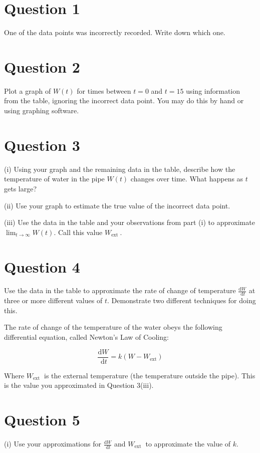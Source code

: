 \documentclass[12pt]{article}
\begin{document}
\section*{Question 1}
One of the data points was incorrectly recorded. Write down which one.

\section*{Question 2}
Plot a graph of $W(t)$ for times between $t=0$ and $t=15$ using information from the table, ignoring the incorrect data point. You may do this by hand or using graphing software.

\section*{Question 3}
(i) Using your graph and the remaining data in the table, describe how the temperature of water in the pipe $W(t)$ changes over time. What happens as $t$ gets large?

(ii) Use your graph to estimate the true value of the incorrect data point.

(iii) Use the data in the table and your observations from part (i) to approximate $\lim _{t \rightarrow \infty} W(t)$. Call this value $W_{\text {ext }}$.

\section*{Question 4}
Use the data in the table to approximate the rate of change of temperature $\frac{\mathrm{d} W}{\mathrm{~d} t}$ at three or more different values of $t$. Demonstrate two different techniques for doing this.

The rate of change of the temperature of the water obeys the following differential equation, called Newton's Law of Cooling:

$$
\frac{\mathrm{d} W}{\mathrm{~d} t}=k\left(W-W_{\mathrm{ext}}\right)
$$

Where $W_{\text {ext }}$ is the external temperature (the temperature outside the pipe). This is the value you approximated in Question 3(iii).

\section*{Question 5}
(i) Use your approximations for $\frac{\mathrm{d} W}{\mathrm{~d} t}$ and $W_{\text {ext }}$ to approximate the value of $k$.
\end{document}
